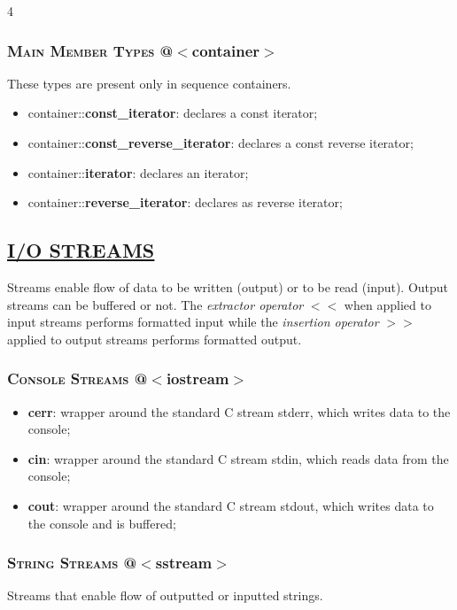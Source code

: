 \documentclass[10pt]{article}
\newcommand{\softseparator}{%
  \par\noindent{\color{RuleGray}\rule{\linewidth}{0.35pt}}\vspace{1pt}
}
\begin{document}
\begin{multicols*}{4}
{\subsubsection*{\textsc{Main Member Types}  @$<$container$>$} 
\noindent These types are present only in sequence containers.

\begin{itemize}[leftmargin=*,topsep=0.25pt]
  \setlength\itemsep{-1.8pt}
	\item container::\textbf{const\_iterator}: declares a const iterator;
	\item container::\textbf{const\_reverse\_iterator}: declares a const reverse iterator;
	\item container::\textbf{iterator}: declares an iterator;
	\item container::\textbf{reverse\_iterator}: declares as reverse iterator;
\end{itemize}

}

\softseparator

{\color{Blue}
\subsection*{\href{https://en.cppreference.com/w/cpp/io}{\underline{I/O STREAMS}}}	
\noindent
Streams enable flow of data to be written (output) or to be read (input). Output streams can be buffered or not.
The \emph{extractor operator} $<<$ when applied to input streams performs formatted input while the \emph{insertion operator} $>>$ applied to output streams performs formatted output. 

\subsubsection*{\textsc{Console Streams}  @$<$iostream$>$} 
\begin{itemize}[leftmargin=*,topsep=0.25pt]
  \setlength\itemsep{-1.8pt}
	\item \textbf{cerr}: wrapper around the standard C stream stderr, which writes data to the console;
	\item \textbf{cin}: wrapper around the standard C stream stdin, which reads data from the console;
	\item \textbf{cout}: wrapper around the standard C stream stdout, which writes data to the console and is buffered;
\end{itemize}

\subsubsection*{\textsc{String Streams}  @$<$sstream$>$}
\noindent
Streams that enable flow of outputted or inputted strings.

}
\end{multicols*}
\end{document}
